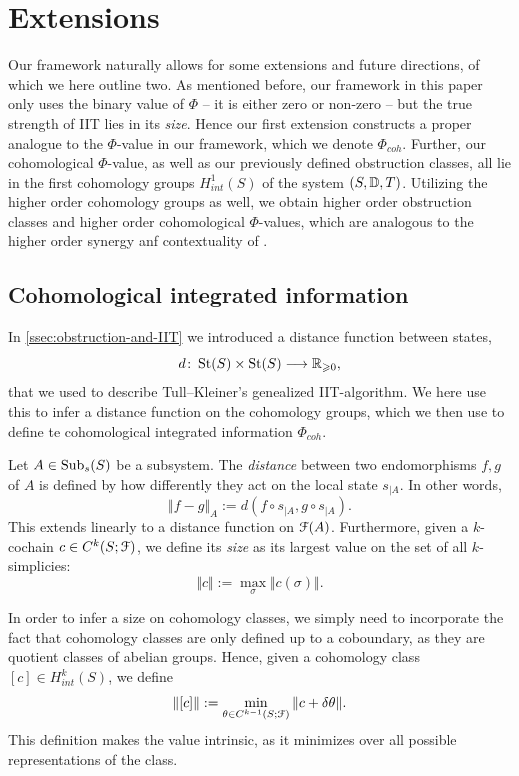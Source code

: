 

\section{Extensions}
Our framework naturally allows for some extensions and future directions, of which we here outline two. As mentioned before, our framework in this paper only uses the binary value of $\Phi$ -- it is either zero or non-zero -- but the true strength of IIT lies in its \emph{size}. Hence our first extension constructs a proper analogue to the $\Phi$-value in our framework, which we denote $\Phi_{coh}$. Further, our cohomological $\Phi$-value, as well as our previously defined obstruction classes, all lie in the first cohomology groups $H^1_{int}(S)$ of the system $(S, \mathbb{D}, T)$. Utilizing the higher order cohomology groups as well, we obtain higher order obstruction classes and higher order cohomological $\Phi$-values, which are analogous to the higher order synergy anf contextuality of \citeme. 

\subsection{Cohomological integrated information}
In \cref{ssec:obstruction-and-IIT} we introduced a distance function between states, 
\[d\colon \operatorname{St}(S)\times \operatorname{St}(S) \longrightarrow \mathbb{R}_{\geqslant 0},\]
that we used to describe Tull--Kleiner's genealized IIT-algorithm. We here use this to infer a distance function on the cohomology groups, which we then use to define te cohomological integrated information $\Phi_{coh}$. 

\begin{definition}
    Let $A\in \operatorname{Sub}_s(S)$ be a subsystem. The \emph{distance} between two endomorphisms $f,g$ of $A$ is defined by how differently they act on the local state $s_{\mid A}$. In other words, 
    \[\Vert f-g \Vert_A := d(f\circ s_{\mid A}, g\circ s_{\mid A}).\]
    This extends linearly to a distance function on $\EuScript{F}(A)$. Furthermore, given a $k$-cochain $c \in C^k(S;\EuScript{F})$, we define its \emph{size} as its largest value on the set of all $k$-simplicies: 
    \[\Vert c \Vert := \max_\sigma \Vert c(\sigma)\Vert.\]
\end{definition}

In order to infer a size on cohomology classes, we simply need to incorporate the fact that cohomology classes are only defined up to a coboundary, as they are quotient classes of abelian groups. Hence, given a cohomology class $[c]\in H^k_{int}(S)$, we define 
\[\Vert [c] \Vert := \min_{\theta\in C^{k-1}(S;\EuScript{F})} \Vert c + \delta \theta \Vert.\]
This definition makes the value intrinsic, as it minimizes over all possible representations of the class. 

